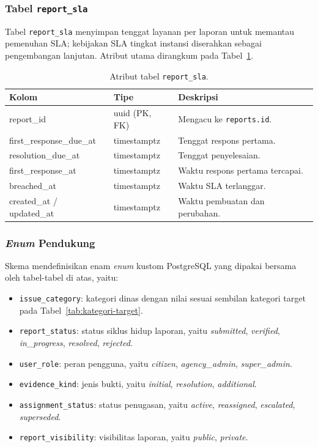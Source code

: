 \subsubsection{Tabel \texttt{report\_sla}}

Tabel \texttt{report\_sla} menyimpan tenggat layanan per laporan untuk memantau pemenuhan SLA; kebijakan SLA tingkat instansi diserahkan sebagai pengembangan lanjutan. Atribut utama dirangkum pada Tabel~\ref{tab:report-sla}.

\begin{table}[htbp]
\centering
\caption{Atribut tabel \texttt{report\_sla}.}
\label{tab:report-sla}
\small
\begin{tabular}{p{3.8cm} p{2.4cm} p{6.3cm}}
\toprule
\textbf{Kolom} & \textbf{Tipe} & \textbf{Deskripsi} \\
\midrule
report\_id & uuid (PK, FK) & Mengacu ke \texttt{reports.id}. \\
first\_response\_due\_at & timestamptz & Tenggat respons pertama. \\
resolution\_due\_at & timestamptz & Tenggat penyelesaian. \\
first\_response\_at & timestamptz & Waktu respons pertama tercapai. \\
breached\_at & timestamptz & Waktu SLA terlanggar. \\
created\_at / updated\_at & timestamptz & Waktu pembuatan dan perubahan. \\
\bottomrule
\end{tabular}
\end{table}

\subsubsection{\textit{Enum} Pendukung}

Skema mendefinisikan enam \textit{enum} kustom PostgreSQL yang dipakai bersama oleh tabel-tabel di atas, yaitu:

\begin{itemize}
    \item \texttt{issue\_category}: kategori dinas dengan nilai sesuai sembilan kategori target pada Tabel~\ref{tab:kategori-target}.
    \item \texttt{report\_status}: status siklus hidup laporan, yaitu \textit{submitted}, \textit{verified}, \textit{in\_progress}, \textit{resolved}, \textit{rejected}.
    \item \texttt{user\_role}: peran pengguna, yaitu \textit{citizen}, \textit{agency\_admin}, \textit{super\_admin}.
    \item \texttt{evidence\_kind}: jenis bukti, yaitu \textit{initial}, \textit{resolution}, \textit{additional}.
    \item \texttt{assignment\_status}: status penugasan, yaitu \textit{active}, \textit{reassigned}, \textit{escalated}, \textit{superseded}.
    \item \texttt{report\_visibility}: visibilitas laporan, yaitu \textit{public}, \textit{private}.
\end{itemize}

